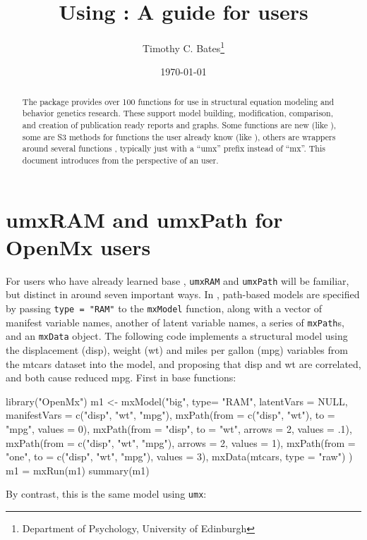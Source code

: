 \documentclass{article}
\title{Using \umx{}: A guide for \OpenMx{} users}
\author{Timothy C. Bates\footnote{Department of Psychology, University of Edinburgh}}
\date{\today}
\newcommand{\code}[1]{\texttt{#1}}
\begin{document}
\maketitle

\begin{abstract}
The \umx{} package \citep{BatesUmx17} provides over 100 functions for use in structural equation modeling and behavior genetics research. These support model building, modification, comparison, and creation of publication ready reports and graphs. Some functions are new (like \umxACE{}), some are S3 methods for functions the user already know (like \plot{}), others are wrappers around several functions \OpenMx{}, typically just with a ``umx'' prefix instead of ``mx''. This document introduces \umx{} from the perspective of an \OpenMx{} user.
\end{abstract}

\section{umxRAM and umxPath for OpenMx users} %
\label{sec:app_OpenMx_differences}

For users who have already learned base , \code{umxRAM} and \code{umxPath} will be familiar, but distinct in around seven important ways. In , path-based models are specified by passing \code{type = "RAM"} to the \code{mxModel} function, along with a vector of manifest variable names, another of latent variable names, a series of \code{mxPath}s, and an \code{mxData} object. The following code implements a structural model using the displacement (disp), weight (wt) and miles per gallon (mpg) variables from the mtcars dataset into the model, and proposing that disp and wt are correlated, and both cause reduced mpg. First in base  functions:

\begin{CodeInput}
library("OpenMx")
m1 <- mxModel("big", type= "RAM",
  latentVars = NULL,
  manifestVars = c("disp", "wt", "mpg"),
  mxPath(from = c("disp", "wt"), to = "mpg", values = 0),
  mxPath(from = "disp", to = "wt", arrows = 2, values = .1),
  mxPath(from = c("disp", "wt", "mpg"), arrows = 2, values = 1),
  mxPath(from = "one", to = c("disp", "wt", "mpg"), values = 3),
  mxData(mtcars, type = "raw")
)
m1 = mxRun(m1)
summary(m1)
\end{CodeInput}

By contrast, this is the same model using \code{umx}:
\end{document}
